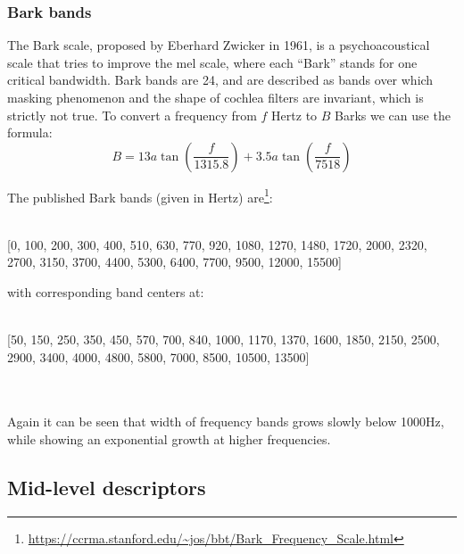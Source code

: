 \subsubsection{Bark bands}
The Bark scale, proposed by Eberhard Zwicker in 1961, is a psychoacoustical scale that tries to improve the mel scale, where each ``Bark'' stands for one critical bandwidth. Bark bands are 24, and are described as bands over which masking phenomenon and the shape of cochlea filters are invariant, which is strictly not true. To convert a frequency from $f$ Hertz to $B$ Barks we can use the formula:
\begin{equation}
B = 13a\tan \left(\frac{f}{1315.8} \right) + 3.5a\tan \left( \frac{f}{7518} \right)
\end{equation}

The published Bark bands (given in Hertz) are\footnote{\url{https://ccrma.stanford.edu/~jos/bbt/Bark_Frequency_Scale.html}}:\\ \\
\hfill\begin{minipage}{\dimexpr\textwidth-1.5cm}
[0, 100, 200, 300, 400, 510, 630, 770, 920, 1080, 1270, 1480, 1720, 2000, 2320, 2700, 3150, 3700, 4400, 5300, 6400, 7700, 9500, 12000, 15500]
\xdef\tpd{\the\prevdepth}
\end{minipage}

with corresponding band centers at:\\ \\
\hfill\begin{minipage}{\dimexpr\textwidth-1.5cm}
[50, 150, 250, 350, 450, 570, 700, 840, 1000, 1170, 1370, 1600, 1850, 2150, 2500, 2900, 3400, 4000, 4800, 5800, 7000, 8500, 10500, 13500]
\xdef\tpd{\the\prevdepth}
\end{minipage}
\\ \\
Again it can be seen that width of frequency bands grows slowly below 1000Hz, while showing an exponential growth at higher frequencies. 

\subsection{Mid-level descriptors}
